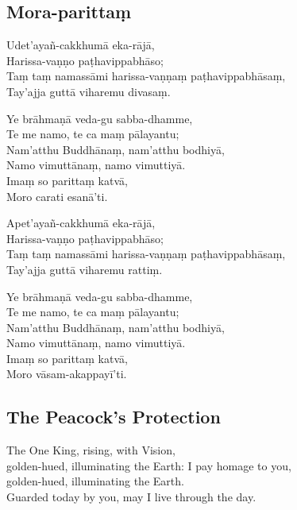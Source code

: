 \subsection{Mora-parittaṃ}
\label{udetayan-cakkhuma}



Udet'ayañ-cakkhumā eka-rājā,\\
Harissa-vaṇṇo paṭhavippabhāso;\\
Taṃ taṃ namassāmi harissa-vaṇṇaṃ paṭhavippabhāsaṃ,\\
Tay'ajja guttā viharemu divasaṃ.

Ye brāhmaṇā veda-gu sabba-dhamme,\\
Te me namo, te ca maṃ pālayantu;\\
Nam'atthu Buddhānaṃ, nam'atthu bodhiyā,\\
Namo vimuttānaṃ, namo vimuttiyā.\\
Imaṃ so parittaṃ katvā,\\
Moro carati esanā'ti.


Apet'ayañ-cakkhumā eka-rājā,\\
Harissa-vaṇṇo paṭhavippabhāso;\\
Taṃ taṃ namassāmi harissa-vaṇṇaṃ paṭhavippabhāsaṃ,\\
Tay'ajja guttā viharemu rattiṃ.

Ye brāhmaṇā veda-gu sabba-dhamme,\\
Te me namo, te ca maṃ pālayantu;\\
Nam'atthu Buddhānaṃ, nam'atthu bodhiyā,\\
Namo vimuttānaṃ, namo vimuttiyā.\\
Imaṃ so parittaṃ katvā,\\
Moro vāsam-akappayī'ti.


\subsection{The Peacock's Protection}

The One King, rising, with Vision,\\
golden-hued, illuminating the Earth: I pay homage to you,\\
golden-hued, illuminating the Earth.\\
Guarded today by you, may I live through the day.

